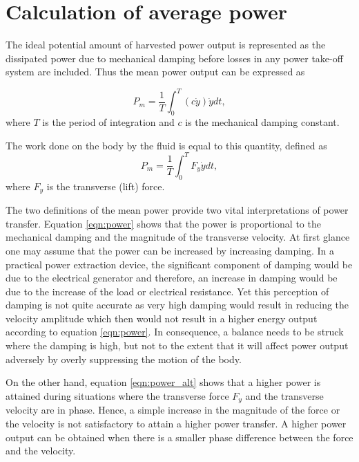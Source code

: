 \section{Calculation of average power}
\label{subsec:ave_pow}
The ideal potential amount of harvested power output is represented as the dissipated power due to mechanical damping before losses in any power take-off system are included. Thus the mean power output can be expressed as 


\begin{equation}
\label{eqn:power}
P_{m}=\frac{1}{T}\int_{0}^{T}(c\dot{y})\dot{y} dt,
\end{equation}
where $T$ is the period of integration and $c$ is the mechanical damping constant. 

The work done on the body by the fluid is equal to this quantity, defined as
\begin{equation}
\label{eqn:power_alt}
P_{m}=\frac{1}{T}\int_{0}^{T}F_y\dot{y} dt,
\end{equation}
where $F_y$ is the transverse (lift) force.

The two definitions of the mean power provide two vital interpretations of power transfer. Equation \ref{eqn:power} shows that the power is proportional to the mechanical damping and the magnitude of the transverse velocity. At first glance one may assume that the power can be increased by increasing damping. In a practical power extraction device, the significant component of damping would be due to the electrical generator and therefore, an increase in damping would be due to the increase of the load or electrical resistance. Yet this perception of damping is not quite accurate as very high damping would result in reducing the velocity amplitude which then would not result in a higher energy output according to equation \ref{eqn:power}. In consequence, a balance needs to be struck where the damping is high, but not to the extent that it will affect power output adversely by overly suppressing the motion of the body.  

On the other hand, equation \ref{eqn:power_alt} shows that a higher power is attained during situations where the transverse force $F_{y}$ and the transverse velocity are in phase. Hence, a simple increase in the magnitude of the force or the velocity is not satisfactory to attain a higher power transfer. A higher power output can be obtained when there is a smaller phase difference between the force and the velocity.   



